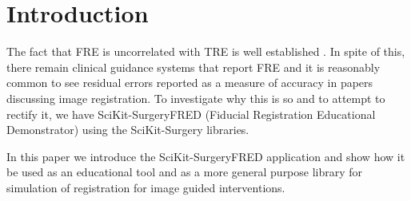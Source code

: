 \section{Introduction}
The fact that \gls{FRE} is uncorrelated with \gls{TRE} is well established 
\cite{fitzpatrick2009}. In spite of this, there remain clinical guidance 
systems that report \gls{FRE} and it is reasonably common to see residual
errors reported as a measure of accuracy in papers discussing image
 registration. To investigate why this is so and to attempt to rectify
 it, we have SciKit-SurgeryFRED (Fiducial Registration Educational Demonstrator)
 \cite{stephen_thompson_2020_3908130} using the 
SciKit-Surgery \cite{PMID:32436132} libraries.

In this paper we introduce the SciKit-SurgeryFRED application and show how it
be used as an educational tool and as a more general purpose library for
simulation of registration for image guided interventions.


